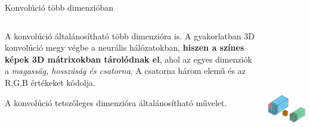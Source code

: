 \documentclass[english, aspectratio=169]{beamer}
\begin{document}
\begin{frame}{Konvolúció több dimenzióban}
	\begin{columns}
		\begin{column}{.5\textwidth}
			A konvolúció általánosítható több dimenzióra is. A gyakorlatban 3D konvolúció megy végbe a neurális hálózatokban, \textbf{hiszen a színes képek 3D mátrixokban tárolódnak el}, ahol az egyes dimenziók a \emph{magasság, hosszúság és csatorna}. A csatorna három elemű és az R,G,B értékeket kódolja.\par\smallskip
			A konvolúció tetszőleges dimenzióra általánosítható művelet.
		\end{column}
		\begin{column}{.5\textwidth}
			\begin{center}
				\includegraphics[height=7cm, width=7cm, keepaspectratio]{images/dl_5.png}
			\end{center}
		\end{column}
	\end{columns}
\end{frame}
\end{document}

